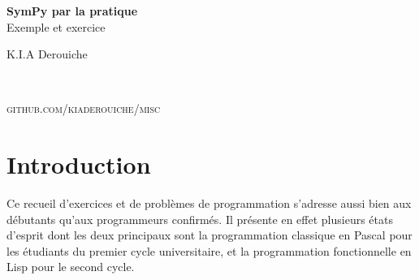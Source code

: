 \documentclass[11pt,fleqn]{book} %
\begin{document}

\begingroup
\thispagestyle{empty}
\centering
\vspace*{5cm}
\par\normalfont\fontsize{35}{35}\sffamily\selectfont
\textbf{SymPy par la pratique}\\
{\LARGE Exemple et exercice}\par %
\vspace*{1cm}
{\Huge K.I.A Derouiche}\par %
\endgroup


\newpage
~\vfill
\thispagestyle{empty}

\noindent \textsc{github.com/kiaderouiche/misc}\\ %




\pagestyle{empty} %

\tableofcontents %


\pagestyle{fancy} %




\section{Introduction}
Ce recueil d'exercices et de problèmes de programmation s'adresse aussi bien aux débutants qu'aux programmeurs confirmés. Il présente en effet plusieurs états d'esprit dont les deux principaux sont la programmation classique en Pascal pour les étudiants du premier cycle universitaire, et la programmation fonctionnelle en Lisp pour le second cycle.
\end{document}
